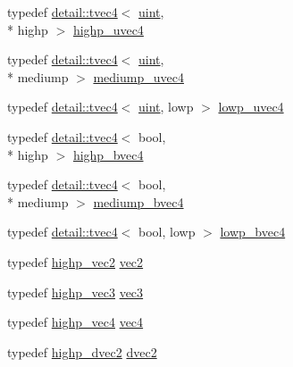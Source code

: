 \begin{DoxyCompactItemize}
\item 
typedef \hyperlink{structglm_1_1detail_1_1tvec4}{detail\-::tvec4}$<$ \hyperlink{group__core__precision_ga4fd29415871152bfb5abd588334147c8}{uint}, \\*
highp $>$ \hyperlink{group__core__precision_ga7cb8cc501f7e680e1889b93eb80e6c46}{highp\-\_\-uvec4}
\item 
typedef \hyperlink{structglm_1_1detail_1_1tvec4}{detail\-::tvec4}$<$ \hyperlink{group__core__precision_ga4fd29415871152bfb5abd588334147c8}{uint}, \\*
mediump $>$ \hyperlink{group__core__precision_gad90c29c2643136a9bcb1165eac47c810}{mediump\-\_\-uvec4}
\item 
typedef \hyperlink{structglm_1_1detail_1_1tvec4}{detail\-::tvec4}$<$ \hyperlink{group__core__precision_ga4fd29415871152bfb5abd588334147c8}{uint}, lowp $>$ \hyperlink{group__core__precision_ga17b5f652e5c64b0034065420d844fca7}{lowp\-\_\-uvec4}
\item 
typedef \hyperlink{structglm_1_1detail_1_1tvec4}{detail\-::tvec4}$<$ bool, \\*
highp $>$ \hyperlink{group__core__precision_ga381539af52c5e5c659700e12fb706eaf}{highp\-\_\-bvec4}
\item 
typedef \hyperlink{structglm_1_1detail_1_1tvec4}{detail\-::tvec4}$<$ bool, \\*
mediump $>$ \hyperlink{group__core__precision_ga8bb7cfe902e2cb356450d211ca4d58e2}{mediump\-\_\-bvec4}
\item 
typedef \hyperlink{structglm_1_1detail_1_1tvec4}{detail\-::tvec4}$<$ bool, lowp $>$ \hyperlink{group__core__precision_ga24c651dc8cb20779b3773428aef4f7f4}{lowp\-\_\-bvec4}
\item 
typedef \hyperlink{group__core__precision_ga37645abcfcc1278567e99f1ca492bfbb}{highp\-\_\-vec2} \hyperlink{group__core__types_gaa1618f51db67eaa145db101d8c8431d8}{vec2}
\item 
typedef \hyperlink{group__core__precision_ga4879124da7a18d6b681d933cb8c4267d}{highp\-\_\-vec3} \hyperlink{group__core__types_ga1c47e8b3386109bc992b6c48e91b0be7}{vec3}
\item 
typedef \hyperlink{group__core__precision_gae32d5f99860247afbe7ed90564bceac1}{highp\-\_\-vec4} \hyperlink{group__core__types_ga5881b1b022d7fd1b7218f5916532dd02}{vec4}
\item 
typedef \hyperlink{group__core__precision_gacfbe8512142fff27f0bfb44958c1752f}{highp\-\_\-dvec2} \hyperlink{group__core__types_gae6727259898288cae197724d5f172b3b}{dvec2}
\item 

\end{DoxyCompactItemize}
